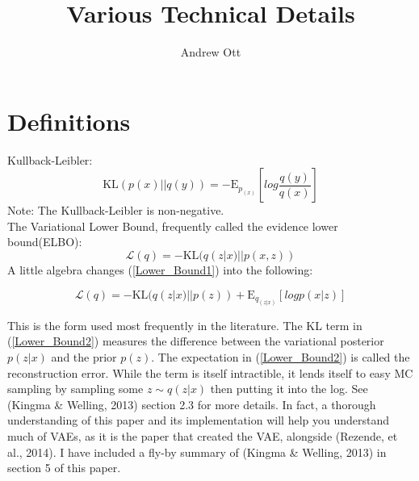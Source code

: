 \documentclass[10pt]{article}
\begin{document}
\title{Various Technical Details}
\date{\vspace{-5ex}}
\author{Andrew Ott}


\maketitle


\section{Definitions}
Kullback-Leibler:
\begin{equation} \label{kl}
\mathrm{KL}(p(x)|| q(y)) = - \mathrm{E}_{p_(x) } [log\frac{q(y)}{q(x)}]
\end{equation}
Note: The Kullback-Leibler is non-negative.\\
The Variational Lower Bound, frequently called the evidence lower bound(ELBO):
\begin{equation}\label{Lower_Bound1}
\mathcal{L}(q)= -\mathrm{KL}(q(z|x)||p(x,z))
\end{equation}
A little algebra changes (\ref{Lower_Bound1})  into the following:

\begin{equation}\label{Lower_Bound2}
\mathcal{L}(q)= -\mathrm{KL}(q(z|x)||p(z)) + \mathrm{E}_{q_(z|x)} [log{p(x|z)}]
\end{equation}

This is the form used most frequently in the literature.  The KL term in (\ref{Lower_Bound2}) measures the difference between the variational posterior $p(z|x)$ and the prior $p(z)$.  The expectation in (\ref{Lower_Bound2}) is called the reconstruction error.  While the term is itself intractible, it lends itself to easy MC sampling by sampling some $z \sim q(z|x)$ then putting it into the log.  See (Kingma \& Welling, 2013) section 2.3 for more details.  In fact, a thorough understanding of this paper and its implementation will help you understand much of VAEs, as it is the paper that created the VAE, alongside (Rezende, et al., 2014).  I have included a fly-by summary of (Kingma \& Welling, 2013) in section 5 of this paper. 
\end{document}
